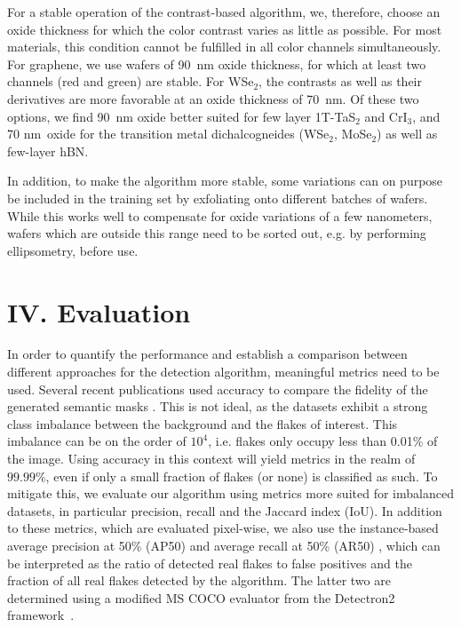 \documentclass[reprint, prl, superscriptaddress, floatfix]{revtex4-2}
\newcommand{\WSe}{WSe$_2$}
\begin{document}
For a stable operation of the contrast-based algorithm, we, therefore, choose an oxide thickness for which the color contrast varies as little as possible. 
For most materials, this condition cannot be fulfilled in all color channels simultaneously.
For graphene, we use wafers of 90~nm oxide thickness, for which at least two channels (red and green) are stable. 
For \WSe, the contrasts as well as their derivatives are more favorable at an oxide thickness of 70~nm. 
Of these two options, we find 90~nm oxide better suited for few layer 1T-TaS$_2$ and CrI$_3$, and 70 nm~oxide for the transition metal dichalcogneides (\WSe, MoSe$_2$) as well as few-layer hBN.

In addition, to make the algorithm more stable, some variations can on purpose be included in the training set by exfoliating onto different batches of wafers. 
While this works well to compensate for oxide variations of a few nanometers, wafers which are outside this range need to be sorted out, e.g. by performing ellipsometry, before use.


\section{IV. Evaluation}

In order to quantify the performance and establish a comparison between different approaches for the detection algorithm, meaningful metrics need to be used. 
Several recent publications used accuracy to compare the fidelity of the generated semantic masks \cite{Han2020Jul,Greplova2020Jun,Sterbentz2021Mar}.
This is not ideal, as the datasets exhibit a strong class imbalance between the background and the flakes of interest.
This imbalance can be on the order of $10^4$, i.e.  flakes only occupy less than 0.01\% of the image.
Using accuracy in this context will yield metrics in the realm of $99.99\%$, even if only a small fraction of flakes (or none) is classified as such.
To mitigate this, we evaluate our algorithm using metrics more suited for imbalanced datasets, in particular precision, recall and the Jaccard index (IoU).
In addition to these metrics, which are evaluated pixel-wise, we also use the instance-based average precision at 50\% (AP50) and average recall at 50\% (AR50) \cite{Lin2014}, which can be interpreted as the ratio of detected real flakes to false positives and the fraction of all real flakes detected by the algorithm. 
The latter two are determined using a modified MS COCO evaluator from the Detectron2 framework~\cite{wu2019detectron2}.
\end{document}
